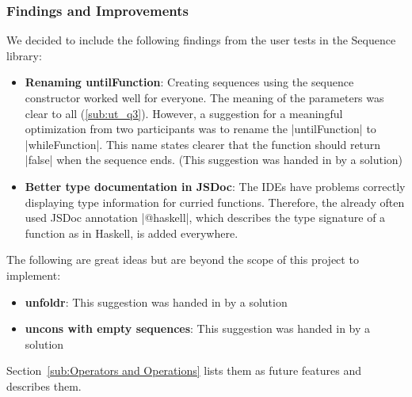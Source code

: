 \subsubsection{Findings and Improvements} %
\label{subsub:seq_findings_and_improvements}
We decided to include the following findings from the user tests in the Sequence
library:
\begin{itemize}
  \item \textbf{Renaming untilFunction}: Creating sequences using the sequence
    constructor worked well for everyone. The meaning of the parameters was
    clear to all (\ref{sub:ut_q3}). However, a suggestion for a meaningful
    optimization from two participants was to rename the |untilFunction| to
    |whileFunction|. This name states clearer that the function should return
    |false| when the sequence ends. (This suggestion was handed in by a
    solution)
  \item \textbf{Better type documentation in JSDoc}: The IDEs have problems
    correctly displaying type information for curried functions.
    Therefore, the already often used JSDoc annotation |@haskell|, which
    describes the type signature of a function as in Haskell, is added
    everywhere.
\end{itemize}
The following are great ideas but are beyond the scope of this project to
implement:
\begin{itemize}
  \item \textbf{unfoldr}: This suggestion was handed in by a solution
  \item \textbf{uncons with empty sequences}: This suggestion was handed in by a solution
\end{itemize}
Section~\ref{sub:Operators and Operations} lists them as future features and
describes them.

